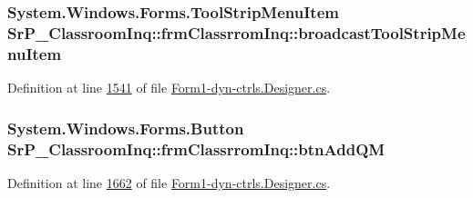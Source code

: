 \hypertarget{class_sr_p___classroom_inq_1_1frm_classrrom_inq_ac34894d134f025ca6e53b41c744bcf8e}{
\subsubsection[{broadcast\-Tool\-Strip\-Menu\-Item}]{\setlength{\rightskip}{0pt plus 5cm}\-System.\-Windows.\-Forms.\-Tool\-Strip\-Menu\-Item {\bf \-Sr\-P\-\_\-\-Classroom\-Inq\-::frm\-Classrrom\-Inq\-::broadcast\-Tool\-Strip\-Menu\-Item}}}
\label{class_sr_p___classroom_inq_1_1frm_classrrom_inq_ac34894d134f025ca6e53b41c744bcf8e}


\-Definition at line \hyperlink{_form1-dyn-ctrls_8_designer_8cs_source_l01541}{1541} of file \hyperlink{_form1-dyn-ctrls_8_designer_8cs_source}{\-Form1-\/dyn-\/ctrls.\-Designer.\-cs}.

\hypertarget{class_sr_p___classroom_inq_1_1frm_classrrom_inq_adda77c1d58e5db64040dff4228e6d97e}{
\subsubsection[{btn\-Add\-Q\-M}]{\setlength{\rightskip}{0pt plus 5cm}\-System.\-Windows.\-Forms.\-Button {\bf \-Sr\-P\-\_\-\-Classroom\-Inq\-::frm\-Classrrom\-Inq\-::btn\-Add\-Q\-M}}}
\label{class_sr_p___classroom_inq_1_1frm_classrrom_inq_adda77c1d58e5db64040dff4228e6d97e}


\-Definition at line \hyperlink{_form1-dyn-ctrls_8_designer_8cs_source_l01662}{1662} of file \hyperlink{_form1-dyn-ctrls_8_designer_8cs_source}{\-Form1-\/dyn-\/ctrls.\-Designer.\-cs}.

